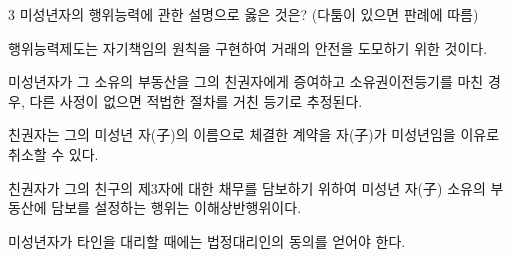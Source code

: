 \begin{question}{3}
미성년자의 행위능력에 관한 설명으로 옳은 것은? (다툼이 있으면 판례에 따름)
\begin{choices}
  \item 행위능력제도는 자기책임의 원칙을 구현하여 거래의 안전을 도모하기 위한 것이다.
  \item 미성년자가 그 소유의 부동산을 그의 친권자에게 증여하고 소유권이전등기를 마친 경우, 다른 사정이 없으면 적법한 절차를 거친 등기로 추정된다.
  \item 친권자는 그의 미성년 자(子)의 이름으로 체결한 계약을 자(子)가 미성년임을 이유로 취소할 수 있다.
  \item 친권자가 그의 친구의 제3자에 대한 채무를 담보하기 위하여 미성년 자(子) 소유의 부동산에 담보를 설정하는 행위는 이해상반행위이다.
  \item 미성년자가 타인을 대리할 때에는 법정대리인의 동의를 얻어야 한다.
\end{choices}
\end{question}
